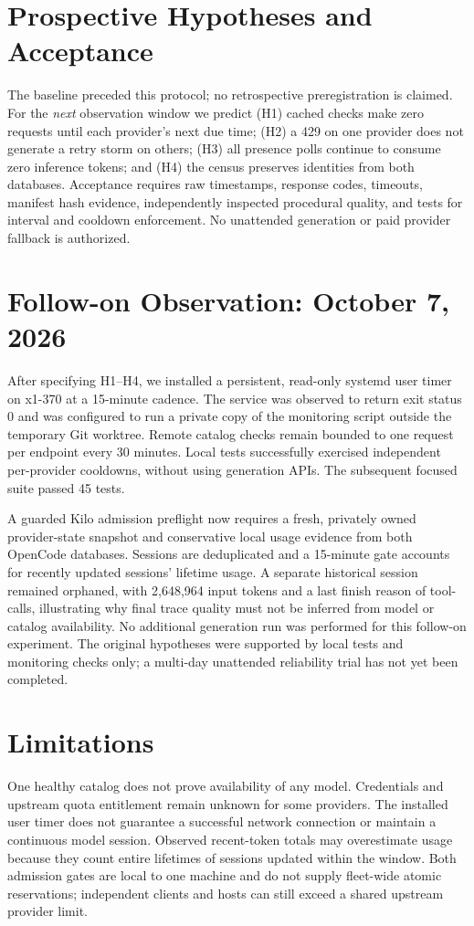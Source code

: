 \documentclass[11pt]{article}
\begin{document}
\section{Prospective Hypotheses and Acceptance}
The baseline preceded this protocol; no retrospective preregistration is
claimed. For the \emph{next} observation window we predict (H1) cached checks
make zero requests until each provider's next due time; (H2) a 429 on one
provider does not generate a retry storm on others; (H3) all presence polls
continue to consume zero inference tokens; and (H4) the census preserves
identities from both databases. Acceptance requires raw timestamps, response
codes, timeouts, manifest hash evidence, independently inspected procedural
quality, and tests for interval and cooldown enforcement. No unattended
generation or paid provider fallback is authorized.

\section{Follow-on Observation: October 7, 2026}
After specifying H1--H4, we installed a persistent, read-only systemd user
timer on x1-370 at a 15-minute cadence. The service was observed to return
exit status 0 and was configured to run a private copy of the monitoring
script outside the temporary Git worktree. Remote catalog checks remain
bounded to one request per endpoint every 30 minutes. Local tests
successfully exercised independent per-provider cooldowns, without using
generation APIs. The subsequent focused suite passed 45 tests.

A guarded Kilo admission preflight now requires a fresh, privately owned
provider-state snapshot and conservative local usage evidence from both
OpenCode databases. Sessions are deduplicated and a 15-minute gate accounts
for recently updated sessions' lifetime usage. A separate historical
session remained orphaned, with 2,648,964 input tokens and a last finish
reason of tool-calls, illustrating why final trace quality must not be
inferred from model or catalog availability. No additional generation run
was performed for this follow-on experiment. The original hypotheses
were supported by local tests and monitoring checks only; a multi-day
unattended reliability trial has not yet been completed.

\section{Limitations}
One healthy catalog does not prove availability of any model. Credentials
and upstream quota entitlement remain unknown for some providers.
The installed user timer does not guarantee a successful network connection
or maintain a continuous model session. Observed recent-token totals may
overestimate usage because they count entire lifetimes of sessions updated
within the window. Both admission gates are local to one machine and do not
supply fleet-wide atomic reservations; independent clients and hosts can
still exceed a shared upstream provider limit.
\end{document}
